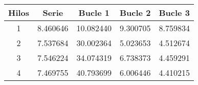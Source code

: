 \begin{tabular}{|c|c|c|c|c|}
\hline \textbf{Hilos} & \textbf{Serie} & \textbf{Bucle 1} & \textbf{Bucle 2} & \textbf{Bucle 3
}\\ 
\hline 1 & 8.460646 & 10.082440 & 9.300705 & 8.759834
\\ 
\hline 2 & 7.537684 & 30.002364 & 5.023653 & 4.512674
\\ 
\hline 3 & 7.546224 & 34.074319 & 6.738373 & 4.459291
\\ 
\hline 4 & 7.469755 & 40.793699 & 6.006446 & 4.410215
\\ 
\hline\end{tabular}